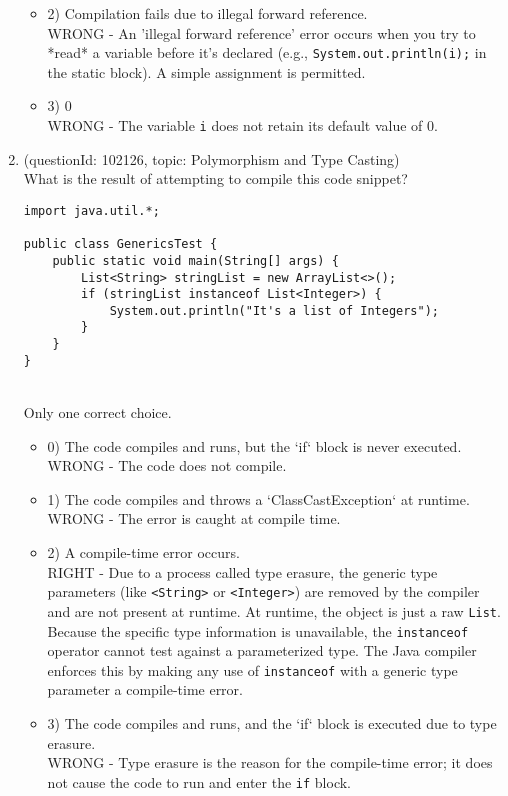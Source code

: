 \documentclass[12pt]{article}
\begin{document}
\begin{enumerate}[label=(\arabic*)]
\begin{itemize}
\item 2) Compilation fails due to illegal forward reference.
 \\ 
WRONG - An 'illegal forward reference' error occurs when you try to *read* a variable before it's declared (e.g., \verb|System.out.println(i);| in the static block). A simple assignment is permitted.

\item 3) 0
 \\ 
WRONG - The variable \verb|i| does not retain its default value of 0.

\end{itemize}
\item (questionId: 102126, topic: Polymorphism and Type Casting) \\ 
What is the result of attempting to compile this code snippet?\n\begin{verbatim}
import java.util.*;

public class GenericsTest {
    public static void main(String[] args) {
        List<String> stringList = new ArrayList<>();
        if (stringList instanceof List<Integer>) {
            System.out.println("It's a list of Integers");
        }
    }
}
\end{verbatim}
\\ \noindent Only one correct choice. 
\begin{itemize}
\item 0) The code compiles and runs, but the `if` block is never executed.
 \\ 
WRONG - The code does not compile.

\item 1) The code compiles and throws a `ClassCastException` at runtime.
 \\ 
WRONG - The error is caught at compile time.

\item 2) A compile-time error occurs.
 \\ 
RIGHT - Due to a process called type erasure, the generic type parameters (like \verb|<String>| or \verb|<Integer>|) are removed by the compiler and are not present at runtime. At runtime, the object is just a raw \verb|List|. Because the specific type information is unavailable, the \verb|instanceof| operator cannot test against a parameterized type. The Java compiler enforces this by making any use of \verb|instanceof| with a generic type parameter a compile-time error.

\item 3) The code compiles and runs, and the `if` block is executed due to type erasure.
 \\ 
WRONG - Type erasure is the reason for the compile-time error; it does not cause the code to run and enter the \verb|if| block.


\end{itemize}
\end{enumerate}
\end{document}
